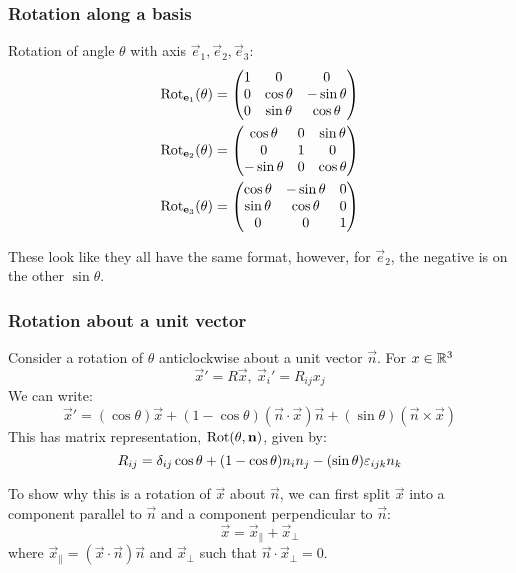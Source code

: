 \documentclass[../main.tex]{subfiles}
\begin{document}
\subsubsection{Rotation along a basis}
Rotation of angle $\theta$ with axis $\vec{e}_1, \vec{e}_2, \vec{e}_3$:
\begin{align*}
  \operatorname{Rot}_{\boldsymbol{\mathbf{e}}_1}(\theta) &= \begin{pmatrix}
  1 & 0 & 0 \\
  0 & \cos \theta & -\sin \theta \\
  0 & \sin \theta & \cos \theta \\
  \end{pmatrix} \\
  \operatorname{Rot}_{\boldsymbol{\mathbf{e}}_2}(\theta) &= \begin{pmatrix}
  \cos \theta & 0 & \sin \theta \\
  0 & 1 & 0 \\
  - \sin \theta & 0 & \cos \theta \\
  \end{pmatrix} \\
  \operatorname{Rot}_{\boldsymbol{\mathbf{e}}_3}(\theta) &= \begin{pmatrix}
  \cos \theta & -\sin \theta & 0 \\
  \sin \theta & \cos \theta & 0 \\
  0 & 0 & 1 \\
  \end{pmatrix}
\end{align*}
\begin{remark}[Warning]
  These look like they all have the same format, however, for $\vec{e}_2$, the negative is on the other $\sin \theta$.
\end{remark}
\subsubsection{Rotation about a unit vector}
Consider a rotation of $\theta$ anticlockwise about a unit vector $\vec{n}$.
For $x \in \mathbb{R}^{3}$
\[
  \vec{x}' = R\vec{x},\ \vec{x}_i' = R_{i j}x_j
\]
We can write:
\[
  \vec{x}' = (\cos \theta)\vec{x} + (1 - \cos \theta)(\vec{n} \cdot \vec{x})\vec{n} + (\sin \theta)(\vec{n} \times \vec{x})
\]
This has matrix representation, $\operatorname{Rot}(\theta, \boldsymbol{\mathbf{n}})$, given by:
\[
  R_{i j} = \delta_{i j}\cos\theta + (1 - \cos \theta)n_in_j - (\sin \theta)\varepsilon_{i j k}n_k
\]

To show why this is a rotation of $\vec{x}$ about $\vec{n}$, we can first split $\vec{x}$ into a component parallel to $\vec{n}$ and a component perpendicular to $\vec{n}$:
\[
  \vec{x} = \vec{x}_{\parallel} + \vec{x}_{\perp}
\]
where $\vec{x}_{\parallel} = (\vec{x} \cdot \vec{n})\vec{n}$ and $\vec{x}_{\perp}$ such that $\vec{n} \cdot \vec{x}_{\perp} = 0$.
\end{document}

